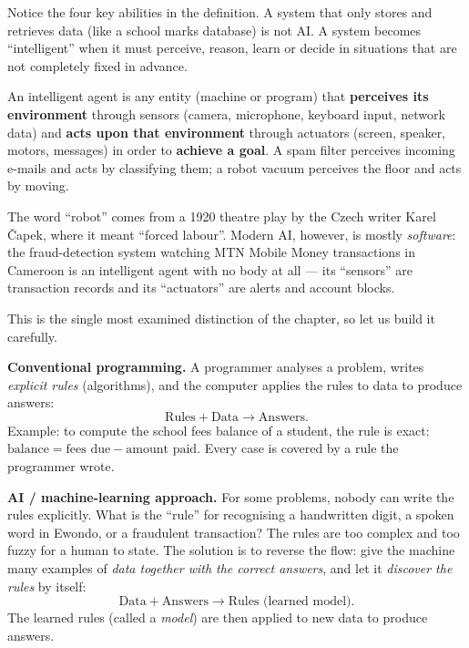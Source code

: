 \documentclass[11pt]{article}
\newcommand{\cle}[1]{{\popxbold\color{popdark}#1}}
\newcounter{popsec}
\newcounter{popsub}
\newcommand{\courssub}[1]{%
  \stepcounter{popsub}%
  \par\vspace{9pt}\noindent{\popxbold\fontsize{11.5}{13}\selectfont\color{popink}{\color{poporange}\thepopsec.\thepopsub}\hspace{6pt}#1}\par\nopagebreak\vspace{4pt}
}
\begin{document}
Notice the four key abilities in the definition. A system that only stores and retrieves data (like a school marks database) is not AI. A system becomes ``intelligent'' when it must perceive, reason, learn or decide in situations that are not completely fixed in advance.

\begin{definition}
An \cle{intelligent agent} is any entity (machine or program) that \textbf{perceives its environment} through sensors (camera, microphone, keyboard input, network data) and \textbf{acts upon that environment} through actuators (screen, speaker, motors, messages) in order to \textbf{achieve a goal}. A spam filter perceives incoming e-mails and acts by classifying them; a robot vacuum perceives the floor and acts by moving.
\end{definition}

\begin{savaistu}
The word ``robot'' comes from a 1920 theatre play by the Czech writer Karel \v{C}apek, where it meant ``forced labour''. Modern AI, however, is mostly \emph{software}: the fraud-detection system watching MTN Mobile Money transactions in Cameroon is an intelligent agent with no body at all --- its ``sensors'' are transaction records and its ``actuators'' are alerts and account blocks.
\end{savaistu}

\courssub{AI versus conventional programming}

This is the single most examined distinction of the chapter, so let us build it carefully.

\textbf{Conventional programming.} A programmer analyses a problem, writes \emph{explicit rules} (algorithms), and the computer applies the rules to data to produce answers:
\[
\text{Rules} + \text{Data} \longrightarrow \text{Answers}.
\]
Example: to compute the school fees balance of a student, the rule is exact: $\text{balance} = \text{fees due} - \text{amount paid}$. Every case is covered by a rule the programmer wrote.

\textbf{AI / machine-learning approach.} For some problems, nobody can write the rules explicitly. What is the ``rule'' for recognising a handwritten digit, a spoken word in Ewondo, or a fraudulent transaction? The rules are too complex and too fuzzy for a human to state. The solution is to reverse the flow: give the machine many examples of \emph{data together with the correct answers}, and let it \emph{discover the rules} by itself:
\[
\text{Data} + \text{Answers} \longrightarrow \text{Rules (learned model)}.
\]
The learned rules (called a \emph{model}) are then applied to new data to produce answers.
\end{document}
